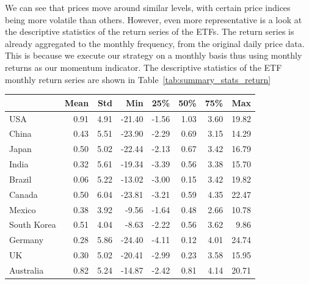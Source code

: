 \documentclass[a4paper,12pt,twoside]{article}
\begin{document}
We can see that prices move around similar levels, with certain price indices being more volatile than others. However, even more representative is a look at the descriptive statistics of the return series of the ETFs. The return series is already aggregated to the monthly frequency, from the original daily price data. This is because we execute our strategy on a monthly basis thus using monthly returns as our momentum indicator. The descriptive statistics of the ETF monthly return series are shown in Table~\ref{tab:summary_stats_return}

\begin{table}[ht]
\centering
\begin{tabular}{lrrrrrrr}
\toprule
             & \textbf{Mean} & \textbf{Std} & \textbf{Min} & \textbf{25\%} & \textbf{50\%} & \textbf{75\%} & \textbf{Max} \\
\midrule
USA          & 0.91          & 4.91         & -21.40       & -1.56         & 1.03          & 3.60          & 19.82       \\
China        & 0.43          & 5.51         & -23.90       & -2.29         & 0.69          & 3.15          & 14.29       \\
Japan        & 0.50          & 5.02         & -22.44       & -2.13         & 0.67          & 3.42          & 16.79       \\
India        & 0.32          & 5.61         & -19.34       & -3.39         & 0.56          & 3.38          & 15.70       \\
Brazil       & 0.06          & 5.22         & -13.02       & -3.00         & 0.15          & 3.42          & 19.82       \\
Canada       & 0.50          & 6.04         & -23.81       & -3.21         & 0.59          & 4.35          & 22.47       \\
Mexico       & 0.38          & 3.92         & -9.56        & -1.64         & 0.48          & 2.66          & 10.78       \\
South Korea  & 0.51          & 4.04         & -8.63        & -2.22         & 0.56          & 3.62          & 9.86        \\
Germany      & 0.28          & 5.86         & -24.40       & -4.11         & 0.12          & 4.01          & 24.74       \\
UK           & 0.30          & 5.02         & -20.41       & -2.99         & 0.23          & 3.58          & 15.95       \\
Australia    & 0.82          & 5.24         & -14.87       & -2.42         & 0.81          & 4.14          & 20.71       \\

\end{tabular}
\end{table}
\end{document}
